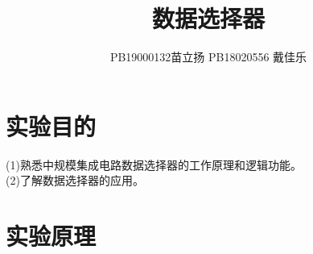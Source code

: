 \documentclass[a4paper,11pt,UTF8]{ctexart}
\title{数据选择器}
\author{PB19000132苗立扬  PB18020556 戴佳乐}
\begin{document}

%
\newcommand{\p}{\par}
\newcommand{\np}{\par\noindent}
%
\newcommand{\expa}{验证4选1数据选择器74LS153的逻辑功能并记录真值表}
\newcommand{\expb}{验证8选1数据选择器74LS151的逻辑功能并记录真值表}
\newcommand{\expc}{用两个8选1数据选择器74LS151扩展成16选1数据选择器，实现逻辑函数$Y=\sum m(6,7,8,11,13)$画出简图并记录真值表}
\newcommand{\expd}{用双4选1数据选择器74LS153实现一位全加器}
\newcommand{\chip}{数据选择器74LS151}

\newcommand{\CI}{C\negthinspace I}
\newcommand{\CO}{C\negthinspace O}
%

\maketitle

\section{实验目的}

(1)熟悉中规模集成电路数据选择器的工作原理和逻辑功能。\\
(2)了解数据选择器的应用。\\


\section{实验原理}
\end{document}
